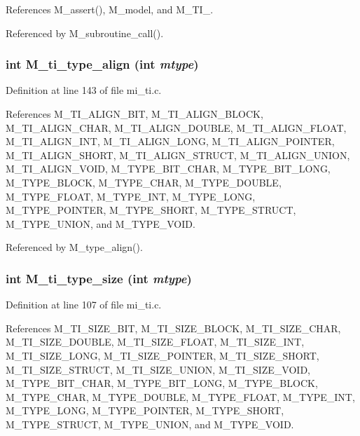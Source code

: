 References M\_\-assert(), M\_\-model, and M\_\-TI\_.

Referenced by M\_\-subroutine\_\-call().
\subsubsection{\setlength{\rightskip}{0pt plus 5cm}int M\_\-ti\_\-type\_\-align (int {\em mtype})}\label{m__ti_8h_5f11ee24540d5f0023156fe826b5b3e6}




Definition at line 143 of file mi\_\-ti.c.

References M\_\-TI\_\-ALIGN\_\-BIT, M\_\-TI\_\-ALIGN\_\-BLOCK, M\_\-TI\_\-ALIGN\_\-CHAR, M\_\-TI\_\-ALIGN\_\-DOUBLE, M\_\-TI\_\-ALIGN\_\-FLOAT, M\_\-TI\_\-ALIGN\_\-INT, M\_\-TI\_\-ALIGN\_\-LONG, M\_\-TI\_\-ALIGN\_\-POINTER, M\_\-TI\_\-ALIGN\_\-SHORT, M\_\-TI\_\-ALIGN\_\-STRUCT, M\_\-TI\_\-ALIGN\_\-UNION, M\_\-TI\_\-ALIGN\_\-VOID, M\_\-TYPE\_\-BIT\_\-CHAR, M\_\-TYPE\_\-BIT\_\-LONG, M\_\-TYPE\_\-BLOCK, M\_\-TYPE\_\-CHAR, M\_\-TYPE\_\-DOUBLE, M\_\-TYPE\_\-FLOAT, M\_\-TYPE\_\-INT, M\_\-TYPE\_\-LONG, M\_\-TYPE\_\-POINTER, M\_\-TYPE\_\-SHORT, M\_\-TYPE\_\-STRUCT, M\_\-TYPE\_\-UNION, and M\_\-TYPE\_\-VOID.

Referenced by M\_\-type\_\-align().
\subsubsection{\setlength{\rightskip}{0pt plus 5cm}int M\_\-ti\_\-type\_\-size (int {\em mtype})}\label{m__ti_8h_fd58899d7ecdf39912cfffbbd4c757ea}




Definition at line 107 of file mi\_\-ti.c.

References M\_\-TI\_\-SIZE\_\-BIT, M\_\-TI\_\-SIZE\_\-BLOCK, M\_\-TI\_\-SIZE\_\-CHAR, M\_\-TI\_\-SIZE\_\-DOUBLE, M\_\-TI\_\-SIZE\_\-FLOAT, M\_\-TI\_\-SIZE\_\-INT, M\_\-TI\_\-SIZE\_\-LONG, M\_\-TI\_\-SIZE\_\-POINTER, M\_\-TI\_\-SIZE\_\-SHORT, M\_\-TI\_\-SIZE\_\-STRUCT, M\_\-TI\_\-SIZE\_\-UNION, M\_\-TI\_\-SIZE\_\-VOID, M\_\-TYPE\_\-BIT\_\-CHAR, M\_\-TYPE\_\-BIT\_\-LONG, M\_\-TYPE\_\-BLOCK, M\_\-TYPE\_\-CHAR, M\_\-TYPE\_\-DOUBLE, M\_\-TYPE\_\-FLOAT, M\_\-TYPE\_\-INT, M\_\-TYPE\_\-LONG, M\_\-TYPE\_\-POINTER, M\_\-TYPE\_\-SHORT, M\_\-TYPE\_\-STRUCT, M\_\-TYPE\_\-UNION, and M\_\-TYPE\_\-VOID.

